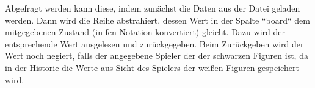     Abgefragt werden kann diese, indem zunächst die Daten aus der Datei
geladen werden. Dann wird die Reihe abstrahiert, dessen Wert in der
Spalte ``board`` dem mitgegebenen Zustand (in fen Notation konvertiert)
gleicht. Dazu wird der entsprechende Wert ausgelesen und zurückgegeben.
Beim Zurückgeben wird der Wert noch negiert, falls der angegebene
Spieler der der schwarzen Figuren ist, da in der Historie die Werte aus
Sicht des Spielers der weißen Figuren gespeichert wird.


